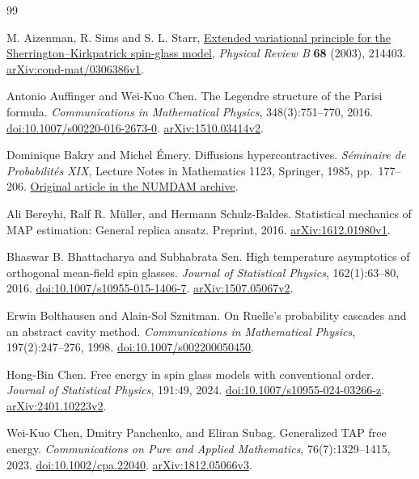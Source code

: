 \begin{thebibliography}{99}

M. Aizenman, R. Sims and S. L. Starr,
\href{https://doi.org/10.1103/PhysRevB.68.214403}{Extended variational principle for the Sherrington--Kirkpatrick spin-glass model},
\emph{Physical Review B} \textbf{68} (2003), 214403.
\href{https://arxiv.org/abs/cond-mat/0306386v1}{arXiv:cond-mat/0306386v1}.

Antonio Auffinger and Wei-Kuo Chen.
The Legendre structure of the Parisi formula.
\emph{Communications in Mathematical Physics}, 348(3):751--770, 2016.
\href{https://doi.org/10.1007/s00220-016-2673-0}{doi:10.1007/s00220-016-2673-0}.
\href{https://arxiv.org/abs/1510.03414v2}{arXiv:1510.03414v2}.

Dominique Bakry and Michel \'Emery.
Diffusions hypercontractives.
\emph{S\'eminaire de Probabilit\'es XIX}, Lecture Notes in Mathematics 1123,
Springer, 1985, pp.~177--206.
\href{https://www.numdam.org/item/SPS_1985__19__177_0/}{Original article in the NUMDAM archive}.

Ali Bereyhi, Ralf R. M\"uller, and Hermann Schulz-Baldes.
Statistical mechanics of MAP estimation: General replica ansatz.
Preprint, 2016.
\href{https://arxiv.org/abs/1612.01980v1}{arXiv:1612.01980v1}.

Bhaswar B. Bhattacharya and Subhabrata Sen.
High temperature asymptotics of orthogonal mean-field spin glasses.
\emph{Journal of Statistical Physics}, 162(1):63--80, 2016.
\href{https://doi.org/10.1007/s10955-015-1406-7}{doi:10.1007/s10955-015-1406-7}.
\href{https://arxiv.org/abs/1507.05067v2}{arXiv:1507.05067v2}.

Erwin Bolthausen and Alain-Sol Sznitman.
On Ruelle's probability cascades and an abstract cavity method.
\emph{Communications in Mathematical Physics}, 197(2):247--276, 1998.
\href{https://doi.org/10.1007/s002200050450}{doi:10.1007/s002200050450}.

Hong-Bin Chen.
Free energy in spin glass models with conventional order.
\emph{Journal of Statistical Physics}, 191:49, 2024.
\href{https://doi.org/10.1007/s10955-024-03266-z}{doi:10.1007/s10955-024-03266-z}.
\href{https://arxiv.org/abs/2401.10223v2}{arXiv:2401.10223v2}.

Wei-Kuo Chen, Dmitry Panchenko, and Eliran Subag.
Generalized TAP free energy.
\emph{Communications on Pure and Applied Mathematics}, 76(7):1329--1415, 2023.
\href{https://doi.org/10.1002/cpa.22040}{doi:10.1002/cpa.22040}.
\href{https://arxiv.org/abs/1812.05066v3}{arXiv:1812.05066v3}.


\end{thebibliography}
